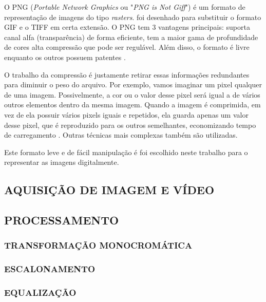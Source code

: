 O PNG (\textit{Portable Network Graphics} ou "\textit{PNG is Not Giff}") é um formato de representação de imagens do tipo \textit{rasters}. foi desenhado para substituir o formato GIF e o TIFF em certa extensão. O PNG tem 3 vantagens principais: suporta canal alfa (transparência) de forma eficiente, tem a maior gama de profundidade de cores alta compressão que pode ser regulável. Além disso, o formato é livre enquanto os outros possuem patentes \cite{png}. 

O trabalho da compressão é justamente retirar essas informações redundantes para diminuir o peso do arquivo. Por exemplo, vamos imaginar um pixel qualquer de uma imagem. Possivelmente, a cor ou o valor desse pixel será igual a de vários outros elementos dentro da mesma imagem. Quando a imagem é comprimida, em vez de ela possuir vários pixels iguais e repetidos, ela guarda apenas um valor desse pixel, que é reproduzido para os outros semelhantes, economizando tempo de carregamento \cite{img_compact}. Outras técnicas mais complexas também são utilizadas.

Este formato leve e de fácil manipulação é foi escolhido neste trabalho para o representar as imagens digitalmente.


\subsection{AQUISIÇÃO DE IMAGEM E VÍDEO}\label{subsec:aquisicao_video}



\subsection{PROCESSAMENTO}\label{subsec:processamento}

\subsubsection{TRANSFORMAÇÃO MONOCROMÁTICA}\label{subsubsec:filtros}

\subsubsection{ESCALONAMENTO}\label{subsubsec:escalonamento}

\subsubsection{EQUALIZAÇÃO}\label{subsubsec:equalizacao}

